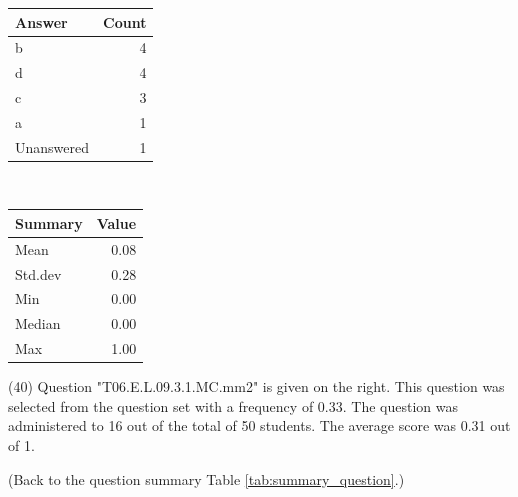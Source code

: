 \documentclass[12pt,english,nohyper]{tufte-handout}\usepackage[]{graphicx}\usepackage[]{color}
\begin{document}
\begin{center}%
\begin{tabular}{lr}
  \hline
Answer & Count \\ 
  \hline
b &   4 \\ 
  d &   4 \\ 
  c &   3 \\ 
  a &   1 \\ 
  Unanswered &   1 \\ 
   \hline
\end{tabular}
~~~~~~~~%
\begin{tabular}{lr}
  \hline
Summary & Value \\ 
  \hline
Mean & 0.08 \\ 
  Std.dev & 0.28 \\ 
  Min & 0.00 \\ 
  Median & 0.00 \\ 
  Max & 1.00 \\ 
   \hline
\end{tabular}
\end{center}\newpage{} (40) Question "T06.E.L.09.3.1.MC.mm2" is given on the right. This question was selected from the question set with a frequency of 0.33. The question was administered to 16 out of the total of 50 students. The average score was 0.31 out of 1.

 (Back to the question summary Table \ref{tab:summary_question}.)
\end{document}
